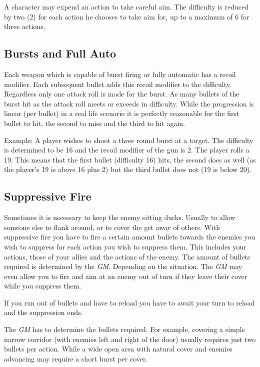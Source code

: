 A character may expend an action to take careful aim. The difficulty is reduced
by two (2) for each action he chooses to take aim for, up to a maximum of 6 for
three actions.

\subsection{Bursts and Full Auto}
\label{sub:7-Bursts and Full Auto}

Each weapon which is capable of burst firing or fully automatic has a recoil
modifier. Each subsequent bullet adds this recoil modifier to the difficulty.
Regardless only one attack roll is made for the burst. As many bullets of the
burst hit as the attack roll meets or exceeds in difficulty. While the
progression is linear (per bullet) in a real life scenario it is perfectly
reasonable for the first bullet to hit, the second to miss and the third to
hit again.

Example: A player wishes to shoot a three round burst at a target. The
difficulty is determined to be 16 and the recoil modifier of the gun is 2.
The player rolls a 19. This means that the first bullet (difficulty 16) hits,
the second does as well (as the player's 19 is above 16 plus 2) but the third
bullet does not (19 is below 20).

\subsection{Suppressive Fire}
\label{sub:7-Suppressive Fire}

Sometimes it is necessary to keep the enemy sitting ducks. Usually to allow
someone else to flank around, or to cover the get away of others. With
suppressive fire you have to fire a certain amount bullets towards the
enemies you wish to suppress for each action you wish to suppress them. This
includes your actions, those of your allies and the actions of the enemy. The
amount of bullets required is determined by the \emph{GM}. Depending on the
situation. The \emph{GM} may even allow you to fire and aim at an enemy out of
turn if they leave their cover while you suppress them.

If you run out of bullets and have to reload you have to await your turn to
reload and the suppression ends.

The \emph{GM} has to determine the bullets required. For example, covering a
simple narrow corridor (with enemies left and right of the door) usually
requires just two bullets per action. While a wide open area with natural
cover and enemies advancing may require a short burst per cover.

